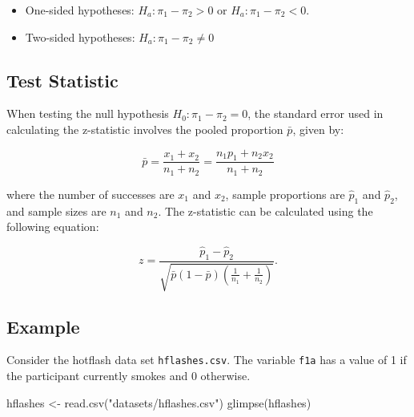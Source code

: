 \documentclass[
  letterpaper,
  DIV=11,
  numbers=noendperiod]{scrartcl}
\newenvironment{Shaded}{\begin{snugshade}}{\end{snugshade}}
\newcommand{\FunctionTok}[1]{\textcolor[rgb]{0.28,0.35,0.67}{#1}}
\newcommand{\NormalTok}[1]{\textcolor[rgb]{0.00,0.23,0.31}{#1}}
\newcommand{\OtherTok}[1]{\textcolor[rgb]{0.00,0.23,0.31}{#1}}
\newcommand{\StringTok}[1]{\textcolor[rgb]{0.13,0.47,0.30}{#1}}
\providecommand{\tightlist}{%
  \setlength{\itemsep}{0pt}\setlength{\parskip}{0pt}}
\begin{document}
\begin{itemize}
\tightlist
\item
  One-sided hypotheses: \(H_a: \pi_1 - \pi_2>0\) or
  \(H_a: \pi_1 - \pi_2<0\).
\item
  Two-sided hypotheses: \(H_a: \pi_1 - \pi_2\neq 0\)
\end{itemize}

\subsection{Test Statistic}\label{test-statistic-5}

When testing the null hypothesis \(H_0: \pi_1 - \pi_2=0\), the standard
error used in calculating the z-statistic involves the pooled proportion
\(\bar{p}\), given by:

\[
\bar{p} = \frac{x_1 + x_2}{n_1 + n_2} = \frac{n_1p_1 + n_2x_2}{n_1 + n_2}
\]

where the number of successes are \(x_1\) and \(x_2\), sample
proportions are \(\hat{p}_1\) and \(\hat{p}_2\), and sample sizes are
\(n_1\) and \(n_2\). The z-statistic can be calculated using the
following equation:

\[
z = \frac{\hat{p}_1 -\hat{p}_2}{\sqrt{\bar{p}(1-\bar{p})\left(\frac{1}{n_1} + \frac{1}{n_2}\right)}}.
\]

\subsection{Example}\label{example-8}

Consider the hotflash data set \texttt{hflashes.csv}. The variable
\texttt{f1a} has a value of 1 if the participant currently smokes and 0
otherwise.

\begin{Shaded}
\begin{Highlighting}[]
\NormalTok{hflashes }\OtherTok{\textless{}{-}} \FunctionTok{read.csv}\NormalTok{(}\StringTok{"datasets/hflashes.csv"}\NormalTok{)}
\FunctionTok{glimpse}\NormalTok{(hflashes)}
\end{Highlighting}
\end{Shaded}
\end{document}
